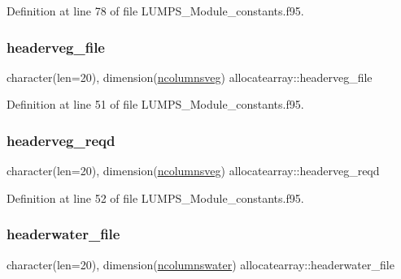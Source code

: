 Definition at line 78 of file L\+U\+M\+P\+S\+\_\+\+Module\+\_\+constants.\+f95.

\mbox{\label{namespaceallocatearray_a48a3f0534f696697267a63f0173f3f23}} 
\subsubsection{\texorpdfstring{headerveg\+\_\+file}{headerveg\_file}}
{\footnotesize\ttfamily character(len=20), dimension(\hyperlink{namespaceallocatearray_a6b492adaf9d6e5563a21d571d5b8f6ec}{ncolumnsveg}) allocatearray\+::headerveg\+\_\+file}



Definition at line 51 of file L\+U\+M\+P\+S\+\_\+\+Module\+\_\+constants.\+f95.

\mbox{\label{namespaceallocatearray_ab4bd7d25443d66ffc38582ff46579d6e}} 
\subsubsection{\texorpdfstring{headerveg\+\_\+reqd}{headerveg\_reqd}}
{\footnotesize\ttfamily character(len=20), dimension(\hyperlink{namespaceallocatearray_a6b492adaf9d6e5563a21d571d5b8f6ec}{ncolumnsveg}) allocatearray\+::headerveg\+\_\+reqd}



Definition at line 52 of file L\+U\+M\+P\+S\+\_\+\+Module\+\_\+constants.\+f95.

\mbox{\label{namespaceallocatearray_a39b586061937f9441f9d0b7288a71133}} 
\subsubsection{\texorpdfstring{headerwater\+\_\+file}{headerwater\_file}}
{\footnotesize\ttfamily character(len=20), dimension(\hyperlink{namespaceallocatearray_a58f6aaf0837a4d8d3383254237a26732}{ncolumnswater}) allocatearray\+::headerwater\+\_\+file}



